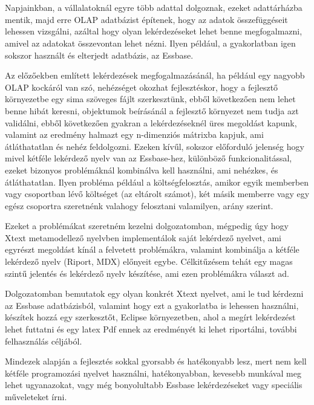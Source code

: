 \chapter*{\bevezeto}
Napjainkban, a vállalatoknál egyre több adattal dolgoznak, ezeket adattárházba mentik, 
majd erre OLAP adatbázist építenek, hogy az adatok összefüggéseit lehessen vizsgálni, 
azáltal hogy olyan lekérdezéseket lehet benne megfogalmazni, amivel az adatokat összevontan lehet nézni. 
Ilyen például, a gyakorlatban igen sokszor használt és elterjedt adatbázis, az Essbase.

Az előzőekben említett lekérdezések megfogalmazásánál, ha például egy nagyobb OLAP kockáról van szó, 
nehézséget okozhat fejlesztéskor, hogy a fejlesztő környezetbe egy sima szöveges
fájlt szerkesztünk, ebből következően nem lehet benne hibát keresni, objektumok beírásánál a
fejlesztő környezet nem tudja azt validálni, ebből következően gyakran a
lekérdezéseknél üres megoldást kapunk, valamint az eredmény halmazt egy
n-dimenziós mátrixba kapjuk, ami átláthatatlan és nehéz feldolgozni. Ezeken
kívűl, sokszor előforduló jelenség hogy mivel kétféle lekérdező nyelv van az Essbase-hez, 
különböző funkcionalitással, ezeket bizonyos problémáknál
kombinálva kell használni, ami nehézkes, és átláthatatlan. Ilyen probléma
például a költségfelosztás, amikor egyik memberben vagy csoportban lévő
költséget (az eltárolt számot), két másik memberre vagy egy egész csoportra
szeretnénk valahogy felosztani valamilyen, arány szerint.

Ezeket a problémákat szeretném kezelni dolgozatomban, mégpedig úgy hogy Xtext
metamodellező nyelvben implementálok saját lekérdező nyelvet, ami egyrészt
megoldást kínál a felvetett problémákra, valamint kombinálja a kétféle lekérdező
nyelv (Riport, MDX) előnyeit egybe. Célkitűzésem tehát egy magas szintű jelentés
és lekérdező nyelv készítése, ami ezen problémákra választ ad.

Dolgozatomban bemutatok egy olyan konkrét Xtext nyelvet, ami le tud kérdezni az
Essbase adatbázisból, valamint hogy ezt a gyakorlatba is lehessen használni,
készítek hozzá egy szerkesztőt, Eclipse környezetben, ahol a megírt lekérdezést
lehet futtatni és egy latex Pdf ennek az eredményét ki lehet riportálni, további
felhasználás céljából.

Mindezek alapján a fejlesztés sokkal gyorsabb és hatékonyabb lesz, mert nem kell
kétféle programozási nyelvet használni, hatékonyabban, kevesebb munkával meg
lehet ugyanazokat, vagy még bonyolultabb Essbase lekérdezéseket vagy speciális
műveleteket írni.


 
